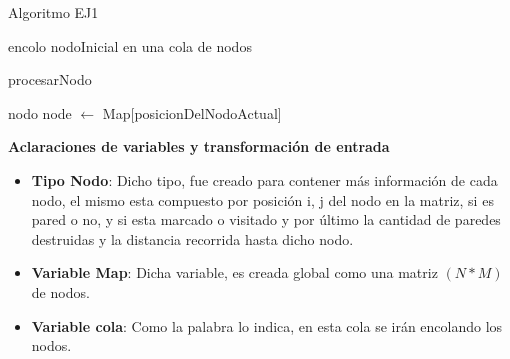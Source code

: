 \begin{algorithm}[H] %
 \caption{Algoritmo EJ1}
	encolo nodoInicial en una cola de nodos \\
	    
\end{algorithm}


\begin{algorithm}[H] %
 \caption{procesarNodo}
 	nodo node $\gets$ Map[posicionDelNodoActual]\\
\end{algorithm}


\textbf{Aclaraciones de variables y transformaci\'on de entrada}

\begin{itemize}
\item {\bf Tipo Nodo}: Dicho tipo, fue creado para contener m\'as informaci\'on de cada nodo, el mismo esta compuesto por posici\'on i, j del nodo en la matriz, si es pared o no, y si esta marcado o visitado y por \'ultimo la cantidad de paredes destruidas y la distancia recorrida hasta dicho nodo.
\item {\bf Variable Map}: Dicha variable, es creada global como una matriz $(N \ast M)$ de nodos.
\item {\bf Variable cola}: Como la palabra lo indica, en esta cola se ir\'an encolando los nodos.
\end{itemize}  


